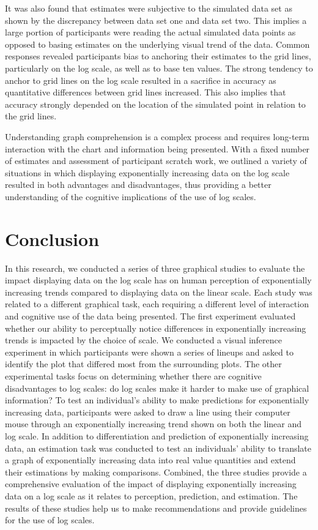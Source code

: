 \documentclass[print]{nuthesis}
\begin{document}
It was also found that estimates were subjective to the simulated data set as shown by the discrepancy between data set one and data set two.
This implies a large portion of participants were reading the actual simulated data points as opposed to basing estimates on the underlying visual trend of the data.
Common responses revealed participants bias to anchoring their estimates to the grid lines, particularly on the log scale, as well as to base ten values.
The strong tendency to anchor to grid lines on the log scale resulted in a sacrifice in accuracy as quantitative differences between grid lines increased.
This also implies that accuracy strongly depended on the location of the simulated point in relation to the grid lines.

Understanding graph comprehension is a complex process and requires long-term interaction with the chart and information being presented.
With a fixed number of estimates and assessment of participant scratch work, we outlined a variety of situations in which displaying exponentially increasing data on the log scale resulted in both advantages and disadvantages, thus providing a better understanding of the cognitive implications of the use of log scales.

\hypertarget{conclusion}{%
\chapter{Conclusion}\label{conclusion}}

In this research, we conducted a series of three graphical studies to evaluate the impact displaying data on the log scale has on human perception of exponentially increasing trends compared to displaying data on the linear scale.
Each study was related to a different graphical task, each requiring a different level of interaction and cognitive use of the data being presented.
The first experiment evaluated whether our ability to perceptually notice differences in exponentially increasing trends is impacted by the choice of scale.
We conducted a visual inference experiment in which participants were shown a series of lineups and asked to identify the plot that differed most from the surrounding plots.
The other experimental tasks focus on determining whether there are cognitive disadvantages to log scales: do log scales make it harder to make use of graphical information?
To test an individual's ability to make predictions for exponentially increasing data, participants were asked to draw a line using their computer mouse through an exponentially increasing trend shown on both the linear and log scale.
In addition to differentiation and prediction of exponentially increasing data, an estimation task was conducted to test an individuals' ability to translate a graph of exponentially increasing data into real value quantities and extend their estimations by making comparisons.
Combined, the three studies provide a comprehensive evaluation of the impact of displaying exponentially increasing data on a log scale as it relates to perception, prediction, and estimation.
The results of these studies help us to make recommendations and provide guidelines for the use of log scales.
\end{document}
